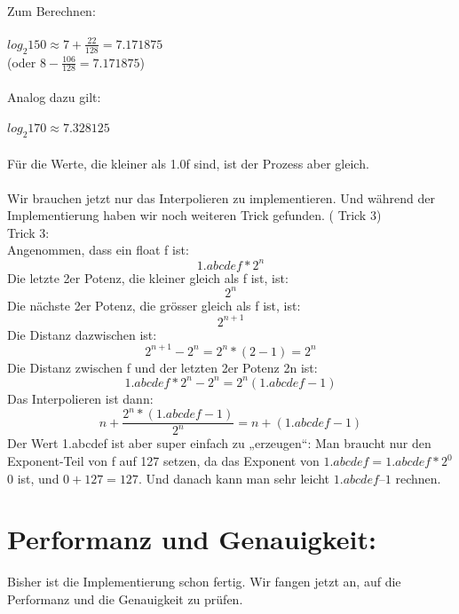 \documentclass[11pt]{article}
\begin{document}
{{{\begin{large}
Zum Berechnen: \\\\
 $log_2{150} \approx 7 + \frac{22}{128} = 7.171875$\\	
(oder $8 - \frac{106}{128} = 7.171875$)\\\\
Analog dazu gilt:\\\\
	$log_2{170} \approx 7.328125$\\\\
F\"ur die Werte, die kleiner als 1.0f sind, ist der Prozess aber gleich.\\\\
Wir brauchen jetzt nur das Interpolieren zu implementieren. Und w\"ahrend der Implementierung haben wir noch weiteren Trick gefunden. ({\color{red} Trick 3})\\
{\color{red} Trick 3:} \\
Angenommen, dass ein float f ist:\\
$$ 1.abcdef * 2^n$$
Die letzte 2er Potenz, die kleiner gleich als f ist, ist:
	$$2^n$$
Die n\"achste 2er Potenz, die gr\"osser gleich als f ist, ist:
	$$2^{n+1}$$
Die Distanz dazwischen ist:
	$$2^{n+1} - 2^n = 2^n*(2 - 1) = 2^n$$
Die Distanz zwischen f und der letzten 2er Potenz 2n ist:
$$1.abcdef * 2^n - 2^n = 2^n (1.abcdef - 1)$$
Das Interpolieren ist dann:
	$$n + \frac{2^n*(1.abcdef - 1)}{2^n} = n + (1.abcdef - 1)$$
Der Wert 1.abcdef ist aber super einfach zu „erzeugen“: Man braucht nur den Exponent-Teil von f auf 127 setzen, da das Exponent von $1.abcdef = 1.abcdef * 2^0$ 0 ist, und $0 + 127 = 127$. Und danach kann man sehr leicht $1.abcdef – 1$ rechnen.\\

\section{Performanz und Genauigkeit:}
Bisher ist die Implementierung schon fertig. Wir fangen jetzt an, auf die Performanz und die Genauigkeit zu pr\"ufen. 

\end{large}}}}
\end{document}
